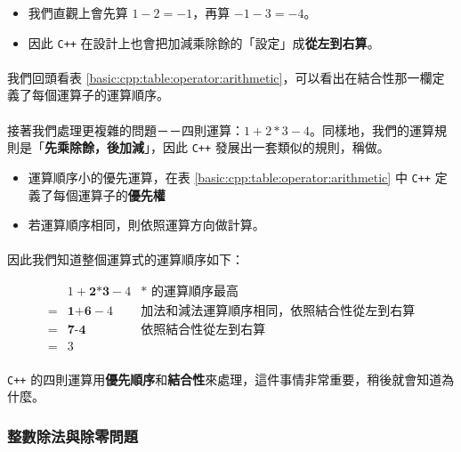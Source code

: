 \documentclass[12pt,a4paper,oneside]{article}
\begin{document}
\begin{CJK}{UTF8}{bkai}
\begin{itemize}
\item 我們直觀上會先算 $1-2=-1$，再算 $-1-3=-4$。
\item 因此 \texttt{C++} 在設計上也會把加減乘除餘的「設定」成\textbf{從左到右算}。
\end{itemize}

\paragraph{}我們回頭看表 \ref{basic:cpp:table:operator:arithmetic}，可以看出在結合性那一欄定義了每個運算子的運算順序。

\paragraph{}接著我們處理更複雜的問題－－四則運算：$1+2*3-4$。同樣地，我們的運算規則是「\textbf{先乘除餘，後加減}」，因此 \texttt{C++} 發展出一套類似的規則，稱做。

\begin{itemize}
\item 運算順序小的優先運算，在表 \ref{basic:cpp:table:operator:arithmetic} 中 \texttt{C++} 定義了每個運算子的\textbf{優先權}
\item 若運算順序相同，則依照運算方向做計算。
\end{itemize}

\paragraph{}因此我們知道整個運算式的運算順序如下：

\begin{align*}
  & 1+\textbf{2*3}-4 &*\text{ 的運算順序最高}\\
= & \textbf{1+6}-4   &\text{加法和減法運算順序相同，依照結合性從左到右算}\\
= & \textbf{7-4}     &\text{依照結合性從左到右算}\\
= & 3
\end{align*}

\paragraph{}\texttt{C++} 的四則運算用\textbf{優先順序}和\textbf{結合性}來處理，這件事情非常重要，稍後就會知道為什麼。

\subsubsection{整數除法與除零問題}


\end{CJK}
\end{document}
